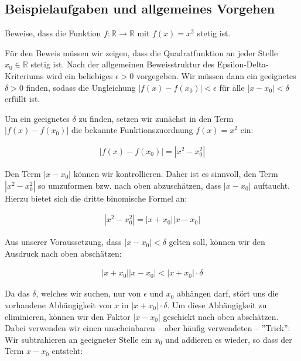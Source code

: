 \documentclass[fontsize=9pt,
               parskip=half-,
               DIV=14,
               listof=chapterentry,
               tocflat]{scrbook}
\begin{document}
\subsection{Beispielaufgaben und allgemeines Vorgehen}

\begin{exercise*}
Beweise, dass die Funktion $f:\mathbb {R} \to \mathbb {R} $ mit $f(x)=x^{2}$ stetig ist.

\end{exercise*}

\begin{solutionprocess*}
Für den Beweis müssen wir zeigen, dass die Quadratfunktion an jeder Stelle $x_{0}\in \mathbb {R} $ stetig ist. Nach der allgemeinen Beweisstruktur des Epsilon-Delta-Kriteriums wird ein beliebiges $\epsilon >0$ vorgegeben. Wir müssen dann ein geeignetes $\delta >0$ finden, sodass die Ungleichung $|f(x)-f(x_{0})|<\epsilon $ für alle $|x-x_{0}|<\delta $ erfüllt ist.

Um ein geeignetes $\delta $ zu finden, setzen wir zunächst in den Term $|f(x)-f(x_{0})|$ die bekannte Funktionszuordnung $f(x)=x^{2}$ ein:

\begin{align*}
|f(x)-f(x_{0})|=\left|x^{2}-x_{0}^{2}\right|
\end{align*}

Den Term $|x-x_{0}|$ können wir kontrollieren. Daher ist es sinnvoll, den Term $\left|x^{2}-x_{0}^{2}\right|$ so umzuformen bzw. nach oben abzuschätzen, dass $|x-x_{0}|$ auftaucht. Hierzu bietet sich die dritte binomische Formel an:

\begin{align*}
|x^{2}-x_{0}^{2}|=|x+x_{0}||x-x_{0}|
\end{align*}

Aus unserer Voraussetzung, dass $|x-x_{0}|<\delta $ gelten soll, können wir den Ausdruck nach oben abschätzen:

\begin{align*}
|x+x_{0}||x-x_{0}|<|x+x_{0}|\cdot \delta 
\end{align*}

Da das $\delta $, welches wir suchen, nur von $\epsilon $ und $x_{0}$ abhängen darf, stört uns die vorhandene Abhängigkeit von $x$ in $|x+x_{0}|\cdot \delta $. Um diese Abhängigkeit zu eliminieren, können wir den Faktor $|x-x_{0}|$ geschickt nach oben abschätzen. Dabei verwenden wir einen unscheinbaren – aber häufig verwendeten – {''}Trick{''}: Wir subtrahieren an geeigneter Stelle ein $x_{0}$ und addieren es wieder, so dass der Term $x-x_{0}$ entsteht:


\end{solutionprocess*}
\end{document}
